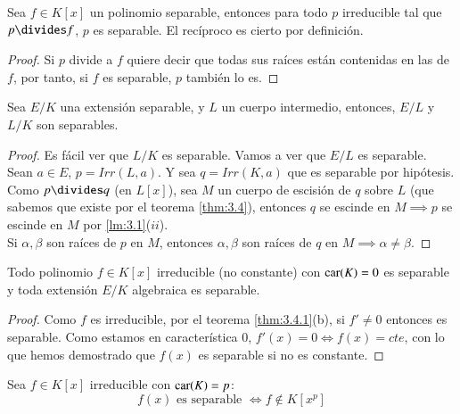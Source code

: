 \begin{pro}\label{pro:sepdiv}
    Sea $f \in K[x]$ un polinomio separable, entonces para todo $p$ irreducible tal que $p \divides f$, $p$ es separable. El recíproco es cierto por definición.
\end{pro}
\begin{proof}
    Si $p$ divide a $f$ quiere decir que todas sus raíces están contenidas en las de $f$, por tanto, si $f$ es separable, $p$ también lo es.
\end{proof}

\begin{pro}
    Sea $E/K$ una extensión separable, y $L$ un cuerpo intermedio, entonces, $E/L$ y $L/K$ son separables.
\end{pro}
\begin{proof}
    Es fácil ver que $L/K$ es separable. Vamos a ver que $E/L$ es separable.\\
    Sean $a \in E$, $p = Irr(L, a)$. Y sea $q = Irr(K, a)$ que es separable por hipótesis. Como $p \divides q$ (en $L[x]$), sea $M$ un cuerpo de escisión de $q$ sobre $L$ (que sabemos que existe por el teorema \ref{thm:3.4}), entonces $q$ se escinde en $M \implies p$ se escinde en $M$ por \ref{lm:3.1}($ii$).\\

    Si $\alpha, \beta$ son raíces de $p$ en $M$, entonces $\alpha, \beta$ son raíces de $q$ en $M \implies \alpha \neq \beta$.
\end{proof}

\begin{lm}\label{lm:3.4.3}
    Todo polinomio $f \in K[x]$ irreducible (no constante) con $\mathrm{car}(K) = 0$ es separable y toda extensión $E/K$ algebraica es separable.
\end{lm}
\begin{proof}
    Como $f$ es irreducible, por el teorema \ref{thm:3.4.1}(b), si $f' \neq 0$ entonces es separable. Como estamos en característica $0$, $f'(x) = 0 \iff f(x) = cte$, con lo que hemos demostrado que $f(x)$ es separable si no es constante.
\end{proof}

\begin{cor}\label{cor:3.4.4}
    Sea $f \in K[x]$ irreducible con $\mathrm{car}(K) = p$:
    $$
        f(x) \text{ es separable } \iff f \notin K[x^p]
    $$
\end{cor}

